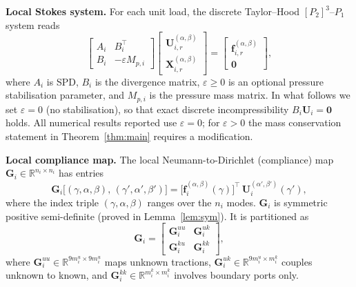 \documentclass[11pt,a4paper]{article}
\newcommand{\R}{\mathbb{R}}
\newcommand{\DtN}{\mathbf{G}}
\newcommand{\loadvec}{\bm{f}}
\newcommand{\respvel}{\mathbf{U}}
\newcommand{\resppres}{\mathbf{X}}
\begin{document}
\medskip\noindent
\textbf{Local Stokes system.}
For each unit load, the discrete Taylor--Hood $[P_2]^3$--$P_1$ system reads
\begin{equation}\label{eq:local-sys}
  \begin{bmatrix} A_i & B_i^\top \\ B_i & -\varepsilon M_{p,i} \end{bmatrix}
  \begin{bmatrix} \respvel_{i,r}^{(\alpha,\beta)} \\
                   \resppres_{i,r}^{(\alpha,\beta)} \end{bmatrix}
  = \begin{bmatrix} \loadvec_{i,r}^{(\alpha,\beta)} \\ \bm{0} \end{bmatrix},
\end{equation}
where $A_i$ is SPD, $B_i$ is the divergence matrix,
$\varepsilon \ge 0$ is an optional pressure stabilisation parameter, and
$M_{p,i}$ is the pressure mass matrix.  In what follows we set
$\varepsilon = 0$ (no stabilisation), so that exact discrete
incompressibility $B_i\respvel_i = \bm{0}$ holds.  All numerical results
reported use $\varepsilon = 0$; for $\varepsilon > 0$ the mass conservation
statement in Theorem~\ref{thm:main} requires a modification.

\medskip\noindent
\textbf{Local compliance map.}
The local Neumann-to-Dirichlet (compliance) map
$\DtN_i \in \R^{n_i \times n_i}$ has entries
\begin{equation}\label{eq:dtn}
  \DtN_i\bigl[(\gamma,\alpha,\beta),\,(\gamma',\alpha',\beta')\bigr]
  = \bigl[\loadvec_{i}^{(\alpha,\beta)}(\gamma)\bigr]^\top\,
    \respvel_{i}^{(\alpha',\beta')}(\gamma'),
\end{equation}
where the index triple $(\gamma,\alpha,\beta)$ ranges over the $n_i$ modes.
$\DtN_i$ is symmetric positive semi-definite (proved in Lemma~\ref{lem:sym}).
It is partitioned as
\[
  \DtN_i =
  \begin{bmatrix}
    \DtN_i^{uu} & \DtN_i^{uk} \\[2pt]
    \DtN_i^{ku} & \DtN_i^{kk}
  \end{bmatrix},
\]
where $\DtN_i^{uu} \in \R^{9m_i^u \times 9m_i^u}$ maps unknown tractions,
$\DtN_i^{uk} \in \R^{9m_i^u \times m_i^k}$ couples unknown to known, and
$\DtN_i^{kk} \in \R^{m_i^k \times m_i^k}$ involves boundary ports only.
\end{document}
